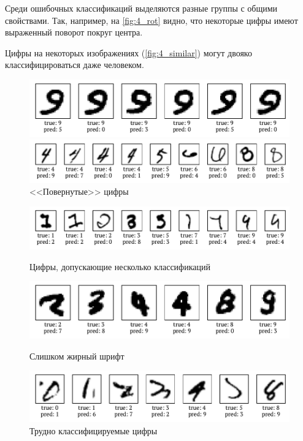 \documentclass[12pt]{article}
\begin{document}
Среди ошибочных классификаций выделяются разные группы с общими свойствами. Так, например, на \autoref{fig:4_rot} видно, что некоторые цифры имеют выраженный поворот покруг центра.


Цифры на некоторых изображениях (\autoref{fig:4_similar}) могут двояко классифицироваться даже человеком.

\begin{figure}[h]
    \includegraphics{4_nines_rot.pdf}

    \includegraphics{4_rot.pdf}
    \caption{<<Повернутые>> цифры}
    \label{fig:4_rot}
\end{figure}
\begin{figure}[h]
    \includegraphics{4_similar.pdf}
    \caption{Цифры, допускающие несколько классификаций}
    \label{fig:4_similar}
    \includegraphics{4_bold.pdf}
    \caption{Слишком жирный шрифт}
    \label{fig:4_bold}
    \includegraphics{4_peculiar.pdf}
    \caption{Трудно классифицируемые цифры}
    \label{fig:4_peculiar}
\end{figure}
\end{document}
